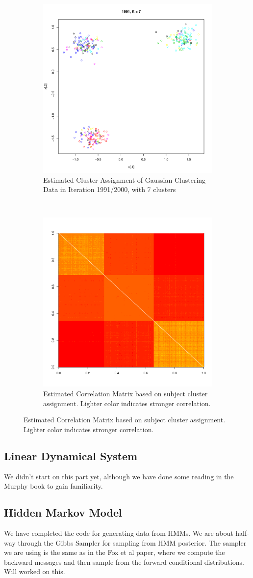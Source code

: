 \documentclass[12pt]{article}
\begin{document}
\begin{figure}
\centering
    \begin{subfigure}{0.5\textwidth}
        \centering
        \includegraphics[width = 0.5\linewidth]{plots/hdp_data.pdf}
        \caption{Estimated Cluster Assignment of Gaussian Clustering Data in Iteration 1991/2000, with 7 clusters}
        \label{fig:1d}
    \end{subfigure}%
    ~
    \begin{subfigure}{0.5\textwidth}
        \centering
        \includegraphics[width = 0.5\linewidth]{plots/hdp_eval.pdf}
        \caption{Estimated Correlation Matrix based on subject cluster assignment. Lighter color indicates stronger correlation.}
        \label{fig:1d}
    \end{subfigure}%
\end{figure}

\subsection{\textbf{Linear Dynamical System}}
We didn't start on this part yet, although we have done some reading in the Murphy book to gain familiarity.

\subsection{\textbf{Hidden Markov Model}}
We have completed the code for generating data from HMMs. We are about half-way through the Gibbs Sampler for sampling from HMM posterior. The sampler we are using is the same as in the Fox et al paper, where we compute the backward messages and then sample from the forward conditional distributions. Will worked on this.
\end{document}
